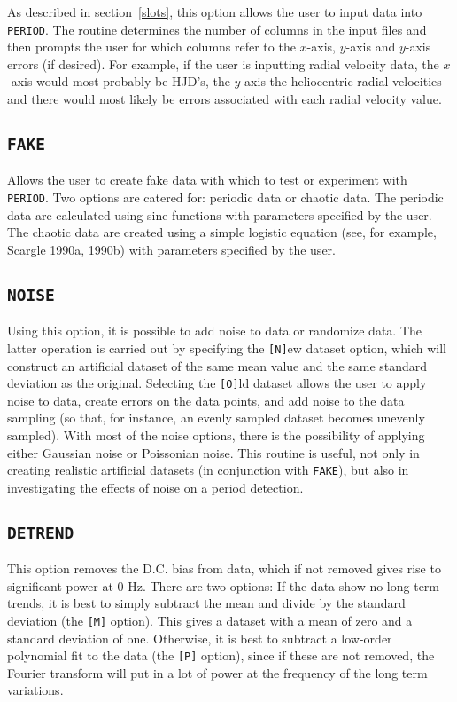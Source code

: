 As described in section~\ref{slots}, this option allows the user to input data
into {\tt PERIOD}. The routine determines the number of columns in the input
files and then prompts the user for which columns refer to the $x$-axis,
$y$-axis and $y$-axis errors (if desired). For example, if the user is
inputting radial velocity data, the $x$-axis would most probably be HJD's, the
$y$-axis the heliocentric radial velocities and there would most likely be
errors associated with each radial velocity value. 

\subsection*{\tt FAKE}

Allows the user to create fake data with which to test or experiment with {\tt
PERIOD}. Two options are catered for: periodic data or chaotic data. The
periodic data are calculated using sine functions with parameters specified by
the user. The chaotic data are created using a simple logistic equation (see,
for example, Scargle 1990a, 1990b) with parameters specified by the user. 

\subsection*{\tt NOISE}

Using this option, it is possible to add noise to data or randomize data. The
latter operation is carried out by specifying the {\tt [N]}ew dataset option,
which will construct an artificial dataset of the same mean value and the same
standard deviation as the original. Selecting the {\tt [O]}ld dataset allows
the user to apply noise to data, create errors on the data points, and add
noise to the data sampling (so that, for instance, an evenly sampled dataset
becomes unevenly sampled). With most of the noise options, there is the
possibility of applying either Gaussian noise or Poissonian noise. This routine
is useful, not only in creating realistic artificial datasets (in conjunction
with {\tt FAKE}), but also in investigating the effects of noise on a period
detection. 

\subsection*{\tt DETREND}

This option removes the D.C. bias from data, which if not removed gives rise to
significant power at 0 Hz. There are two options: If the data show no long term
trends, it is best to simply subtract the mean and divide by the standard
deviation (the {\tt [M]} option). This gives a dataset with a mean of zero and
a standard deviation of one. Otherwise, it is best to subtract a low-order
polynomial fit to the data (the {\tt [P]} option), since if these are not
removed, the Fourier transform will put in a lot of power at the frequency of
the long term variations. 

